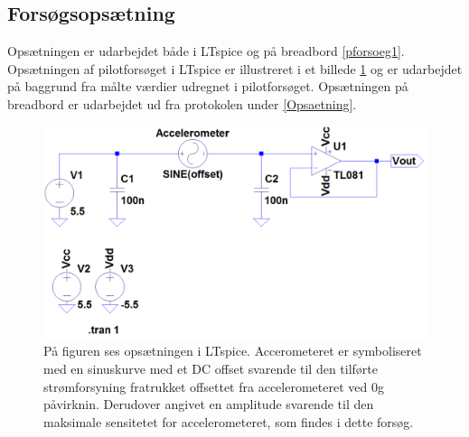 \subsection{Forsøgsopsætning}
Opsætningen er udarbejdet både i LTspice og på breadbord \ref{pforsoeg1}. Opsætningen af pilotforsøget i LTspice  er illustreret i et billede \ref{pLTspice} og er udarbejdet på baggrund fra målte værdier udregnet i pilotforsøget. Opsætningen på breadbord er udarbejdet ud fra protokolen under \ref{Opsaetning}.  

\begin{figure}[H]
		\centering
		\includegraphics[scale=0.4]{figures/Bilag/Test_opsaetning.PNG}
		\caption{På figuren ses opsætningen i LTspice. Accerometeret er symboliseret med en sinuskurve med et DC offset svarende til den tilførte strømforsyning fratrukket offsettet fra accelerometeret ved $0$g påvirknin. Derudover angivet en amplitude svarende til den maksimale sensitetet for accelerometeret, som findes i dette forsøg.}
		\label{pLTspice}
\end{figure}

